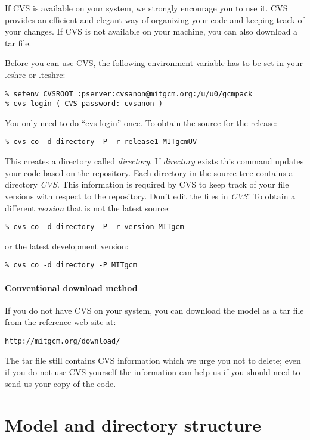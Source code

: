 If CVS is available on your system, we strongly encourage you to use it. CVS
provides an efficient and elegant way of organizing your code and keeping
track of your changes. If CVS is not available on your machine, you can also
download a tar file.

Before you can use CVS, the following environment variable has to be set in
your .cshrc or .tcshrc:
\begin{verbatim}
% setenv CVSROOT :pserver:cvsanon@mitgcm.org:/u/u0/gcmpack
% cvs login ( CVS password: cvsanon )
\end{verbatim}

You only need to do ``cvs login'' once. To obtain the source for the release:
\begin{verbatim}
% cvs co -d directory -P -r release1 MITgcmUV
\end{verbatim}

This creates a directory called \textit{directory}. If \textit{directory}
exists this command updates your code based on the repository. Each
directory in the source tree contains a directory \textit{CVS}. This
information is required by CVS to keep track of your file versions with
respect to the repository. Don't edit the files in \textit{CVS}! To obtain a
different \textit{version} that is not the latest source:
\begin{verbatim}
% cvs co -d directory -P -r version MITgcm
\end{verbatim}
or the latest development version:
\begin{verbatim}
% cvs co -d directory -P MITgcm
\end{verbatim}

\paragraph*{Conventional download method}
\label{sect:conventionalDownload}

If you do not have CVS on your system, you can download the model as a
tar file from the reference web site at:
\begin{verbatim}
http://mitgcm.org/download/
\end{verbatim}
The tar file still contains CVS information which we urge you not to
delete; even if you do not use CVS yourself the information can help
us if you should need to send us your copy of the code.

\section{Model and directory structure}

